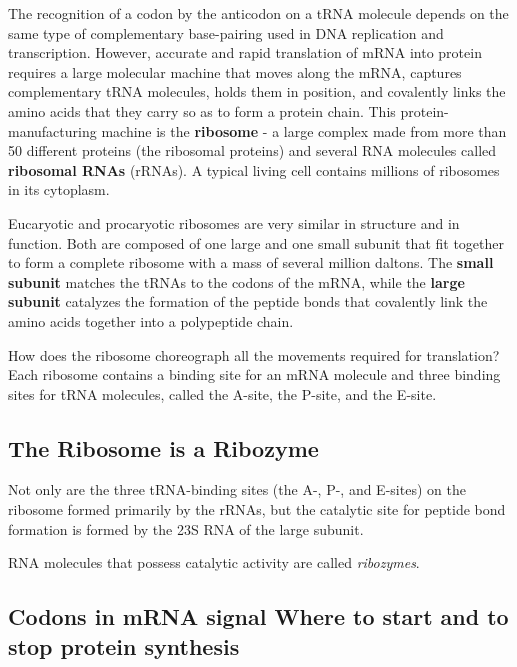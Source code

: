 The recognition of a codon by the anticodon on a tRNA molecule depends
on the same type of complementary base-pairing used in DNA replication
and transcription. However, accurate and rapid translation of mRNA
into protein requires a large molecular machine that moves along the
mRNA, captures complementary tRNA molecules, holds them in position,
and covalently links the amino acids that they carry so as to form a
protein chain. This protein-manufacturing machine is the \textbf{ribosome} - a
large complex made from more than 50 different proteins (the ribosomal
proteins) and several RNA molecules called \textbf{ribosomal RNAs} (rRNAs). A
typical living cell contains millions of ribosomes in its cytoplasm.

Eucaryotic and procaryotic ribosomes are very similar in structure and
in function. Both are composed of one large and one small subunit that
fit together to form a complete ribosome with a mass of several million daltons.
The \textbf{small subunit} matches the tRNAs to
the codons of the mRNA, while the \textbf{large subunit} catalyzes the formation
of the peptide bonds that covalently link the amino acids together
into a polypeptide chain.

How does the ribosome choreograph all the movements required for
translation? Each ribosome contains a binding site for an mRNA molecule
and three binding sites for tRNA molecules, called the A-site, the
P-site, and the E-site.

\subsection{The Ribosome is a Ribozyme}

Not only are the three tRNA-binding sites (the A-, P-, and E-sites) on the
ribosome formed primarily by the rRNAs, but the catalytic site for peptide
bond formation is formed by the 23S RNA of the large subunit.

RNA molecules that possess catalytic activity are called \textit{ribozymes}.

\subsection{Codons in mRNA signal Where to start and to stop protein synthesis}

